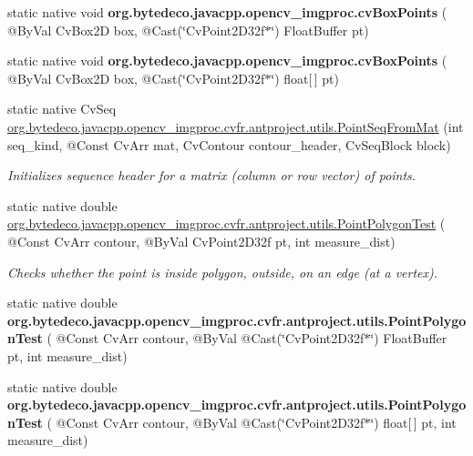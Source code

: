 \begin{DoxyCompactItemize}
\mbox{\label{group__imgproc__c_ga923ce3b064664dde1fc84d9e7972abda}} 
static native void {\bfseries org.\+bytedeco.\+javacpp.\+opencv\+\_\+imgproc.\+cv\+Box\+Points} ( @By\+Val Cv\+Box2D box, @Cast(\char`\"{}Cv\+Point2\+D32f$\ast$\char`\"{}) Float\+Buffer pt)
\item 
\mbox{\label{group__imgproc__c_ga7a9d650500800b7c63e78ddc67ad6b54}} 
static native void {\bfseries org.\+bytedeco.\+javacpp.\+opencv\+\_\+imgproc.\+cv\+Box\+Points} ( @By\+Val Cv\+Box2D box, @Cast(\char`\"{}Cv\+Point2\+D32f$\ast$\char`\"{}) float\mbox{[}$\,$\mbox{]} pt)
\item 
static native Cv\+Seq \hyperlink{group__imgproc__c_ga75ebb68fece47bfb144af0ad2a86668e}{org.\+bytedeco.\+javacpp.\+opencv\+\_\+imgproc.\+cv\+fr.antproject.utils.Point\+Seq\+From\+Mat} (int seq\+\_\+kind, @Const Cv\+Arr mat, Cv\+Contour contour\+\_\+header, Cv\+Seq\+Block block)
\begin{DoxyCompactList}\small\item\em Initializes sequence header for a matrix (column or row vector) of points. \end{DoxyCompactList}\item 
static native double \hyperlink{group__imgproc__c_ga9702f652ace9af304514bd89286968b5}{org.\+bytedeco.\+javacpp.\+opencv\+\_\+imgproc.\+cv\+fr.antproject.utils.Point\+Polygon\+Test} ( @Const Cv\+Arr contour, @By\+Val Cv\+Point2\+D32f pt, int measure\+\_\+dist)
\begin{DoxyCompactList}\small\item\em Checks whether the point is inside polygon, outside, on an edge (at a vertex). \end{DoxyCompactList}\item 
\mbox{\label{group__imgproc__c_ga76bf0f2db014bb14ede0fe00352dae81}} 
static native double {\bfseries org.\+bytedeco.\+javacpp.\+opencv\+\_\+imgproc.\+cv\+fr.antproject.utils.Point\+Polygon\+Test} ( @Const Cv\+Arr contour, @By\+Val @Cast(\char`\"{}Cv\+Point2\+D32f$\ast$\char`\"{}) Float\+Buffer pt, int measure\+\_\+dist)
\item 
\mbox{\label{group__imgproc__c_gaf29359aa5704e498a542f086b90a9736}} 
static native double {\bfseries org.\+bytedeco.\+javacpp.\+opencv\+\_\+imgproc.\+cv\+fr.antproject.utils.Point\+Polygon\+Test} ( @Const Cv\+Arr contour, @By\+Val @Cast(\char`\"{}Cv\+Point2\+D32f$\ast$\char`\"{}) float\mbox{[}$\,$\mbox{]} pt, int measure\+\_\+dist)

\end{DoxyCompactItemize}
